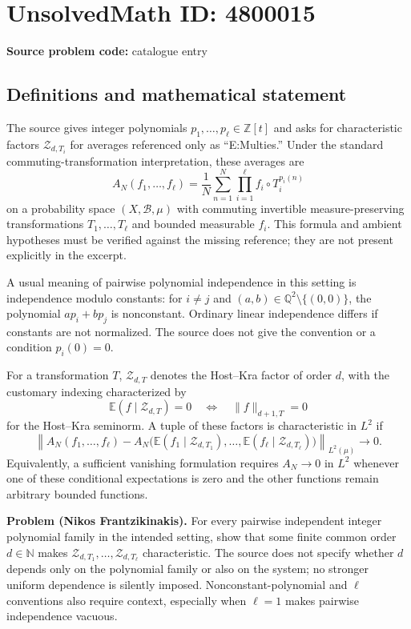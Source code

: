 \documentclass[11pt]{article}
\newcommand{\N}{\mathbb{N}}
\newcommand{\Z}{\mathbb{Z}}
\newcommand{\Q}{\mathbb{Q}}
\newcommand{\E}{\mathbb{E}}
\begin{document}
\section*{UnsolvedMath ID: 4800015}
\textbf{Source problem code:} catalogue entry
\subsection{Definitions and mathematical statement}
The source gives integer polynomials $p_1,\ldots,p_\ell\in\Z[t]$ and asks for characteristic factors $\mathcal Z_{d,T_i}$ for averages referenced only as ``E:Multies.'' Under the standard commuting-transformation interpretation, these averages are
\[
 A_N(f_1,\ldots,f_\ell)=\frac1N\sum_{n=1}^{N}
       \prod_{i=1}^{\ell}f_i\circ T_i^{p_i(n)}
\]
on a probability space $(X,\mathcal B,\mu)$ with commuting invertible measure-preserving transformations $T_1,\ldots,T_\ell$ and bounded measurable $f_i$. This formula and ambient hypotheses must be verified against the missing reference; they are not present explicitly in the excerpt.

A usual meaning of pairwise polynomial independence in this setting is independence modulo constants: for $i\ne j$ and $(a,b)\in\Q^2\setminus\{(0,0)\}$, the polynomial $ap_i+bp_j$ is nonconstant. Ordinary linear independence differs if constants are not normalized. The source does not give the convention or a condition $p_i(0)=0$.

For a transformation $T$, $\mathcal Z_{d,T}$ denotes the Host--Kra factor of order $d$, with the customary indexing characterized by
\[
 \E(f\mid\mathcal Z_{d,T})=0\quad\Longleftrightarrow\quad
 \|f\|_{d+1,T}=0
\]
for the Host--Kra seminorm. A tuple of these factors is characteristic in $L^2$ if
\[
 \left\|A_N(f_1,\ldots,f_\ell)-
 A_N\bigl(\E(f_1\mid\mathcal Z_{d,T_1}),\ldots,
          \E(f_\ell\mid\mathcal Z_{d,T_\ell})\bigr)\right\|_{L^2(\mu)}\to0.
\]
Equivalently, a sufficient vanishing formulation requires $A_N\to0$ in $L^2$ whenever one of these conditional expectations is zero and the other functions remain arbitrary bounded functions.

\textbf{Problem (Nikos Frantzikinakis).} For every pairwise independent integer polynomial family in the intended setting, show that some finite common order $d\in\N$ makes $\mathcal Z_{d,T_1},\ldots,\mathcal Z_{d,T_\ell}$ characteristic. The source does not specify whether $d$ depends only on the polynomial family or also on the system; no stronger uniform dependence is silently imposed. Nonconstant-polynomial and $\ell$ conventions also require context, especially when $\ell=1$ makes pairwise independence vacuous.
\end{document}
